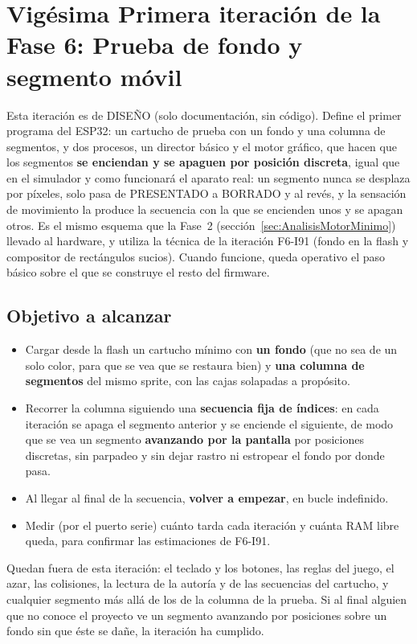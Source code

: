 \section{Vigésima Primera iteración de la Fase 6: Prueba de fondo y segmento móvil}
\label{sec:F6I92}

Esta iteración es de DISEÑO (solo documentación, sin código). Define el primer programa del ESP32: un cartucho de prueba con un fondo y una columna de segmentos, y dos procesos, un director básico y el motor gráfico, que hacen que los segmentos \textbf{se enciendan y se apaguen por posición discreta}, igual que en el simulador y como funcionará el aparato real: un segmento nunca se desplaza por píxeles, solo pasa de PRESENTADO a BORRADO y al revés, y la sensación de movimiento la produce la secuencia con la que se encienden unos y se apagan otros. Es el mismo esquema que la Fase~2 (sección~\ref{sec:AnalisisMotorMinimo}) llevado al hardware, y utiliza la técnica de la iteración F6-I91 (fondo en la flash y compositor de rectángulos sucios). Cuando funcione, queda operativo el paso básico sobre el que se construye el resto del firmware.

\subsection{Objetivo a alcanzar}
\label{sec:F6I92Objetivo}

\begin{itemize}
	\item Cargar desde la flash un cartucho mínimo con \textbf{un fondo} (que no sea de un solo color, para que se vea que se restaura bien) y \textbf{una columna de segmentos} del mismo sprite, con las cajas solapadas a propósito.
	\item Recorrer la columna siguiendo una \textbf{secuencia fija de índices}: en cada iteración se apaga el segmento anterior y se enciende el siguiente, de modo que se vea un segmento \textbf{avanzando por la pantalla} por posiciones discretas, sin parpadeo y sin dejar rastro ni estropear el fondo por donde pasa.
	\item Al llegar al final de la secuencia, \textbf{volver a empezar}, en bucle indefinido.
	\item Medir (por el puerto serie) cuánto tarda cada iteración y cuánta RAM libre queda, para confirmar las estimaciones de F6-I91.
\end{itemize}

Quedan fuera de esta iteración: el teclado y los botones, las reglas del juego, el azar, las colisiones, la lectura de la autoría y de las secuencias del cartucho, y cualquier segmento más allá de los de la columna de la prueba. Si al final alguien que no conoce el proyecto ve un segmento avanzando por posiciones sobre un fondo sin que éste se dañe, la iteración ha cumplido.

